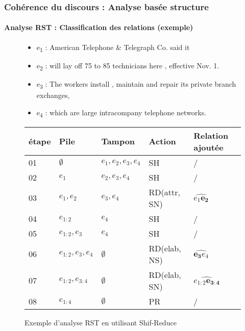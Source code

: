 \documentclass[xcolor=table]{beamer}
\begin{document}
\begin{frame}
	\frametitle{Cohérence du discours : Analyse basée structure}
	\framesubtitle{Analyse RST : Classification des relations (exemple)}
	
	\begin{figure}
		\begin{minipage}{0.25\textwidth}
		\end{minipage}
		\begin{minipage}{0.70\textwidth}
			\scriptsize
			\begin{itemize}
				\item e\textsubscript{1} : American Telephone \& Telegraph Co. said it
				\item e\textsubscript{2} : will lay off 75 to 85 technicians here , effective Nov. 1.
				\item e\textsubscript{3} : The workers install , maintain and repair its private branch exchanges,
				\item e\textsubscript{4} : which are large intracompany telephone networks.
			\end{itemize}
		\end{minipage}
		
		\small
		\begin{tabular}{lllll}
			\hline\hline 
			étape & Pile & Tampon & Action & Relation ajoutée \\
			\hline
			01 & $\emptyset$ & $e_1, e_2, e_3, e_4$ & SH & / \\
			02 & $e_1$ & $e_2, e_3, e_4$ & SH & / \\
			03 & $e_1, e_2$ & $e_3, e_4$ & RD(attr, SN) & $\widehat{e_1 \mathbf{e_2}}$ \\
			04 & $e_{1:2}$ & $e_4$ & SH & / \\
			05 & $e_{1:2}, e_3$ & $e_4$ & SH & / \\
			06 & $e_{1:2}, e_3, e_4$ & $\emptyset$ & RD(elab, NS) & $\widehat{\mathbf{e_3} e_4}$ \\
			07 & $e_{1:2}, e_{3:4}$ & $\emptyset$ & RD(elab, SN) & $\widehat{e_{1:2}\mathbf{e_{3:4}}}$ \\
			08 & $e_{1:4}$ & $\emptyset$ & PR & / \\
			\hline\hline
		\end{tabular}
		\caption{Exemple d'analyse RST en utilisant Shif-Reduce \cite{2018-yu-al}}
	\end{figure}
	
\end{frame}
\end{document}
